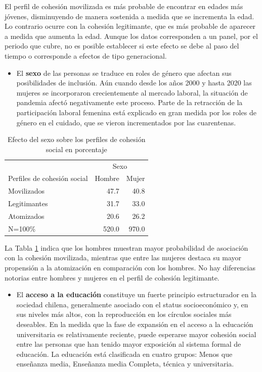 \documentclass[
  12pt,
]{book}
\providecommand{\tightlist}{%
  \setlength{\itemsep}{0pt}\setlength{\parskip}{0pt}}
\begin{document}
El perfil de cohesión movilizada es más probable de encontrar en edades más jóvenes, disminuyendo de manera sostenida a medida que se incrementa la edad. Lo contrario ocurre con la cohesión legitimante, que es más probable de aparecer a medida que aumenta la edad. Aunque los datos corresponden a un panel, por el periodo que cubre, no es posible establecer si este efecto se debe al paso del tiempo o corresponde a efectos de tipo generacional.

\begin{itemize}
\tightlist
\item
  El \textbf{sexo} de las personas se traduce en roles de género que afectan sus posibilidades de inclusión. Aún cuando desde los años 2000 y hasta 2020 las mujeres se incorporaron crecientemente al mercado laboral, la situación de pandemia afectó negativamente este proceso. Parte de la retracción de la participación laboral femenina está explicado en gran medida por los roles de género en el cuidado, que se vieron incrementados por las cuarentenas.
\end{itemize}

\begin{table}

\caption{\label{tab:clases-sexo}Efecto del sexo sobre los perfiles de cohesión social en porcentaje}
\centering
\begin{tabular}[t]{l|r|r}
\hline
\multicolumn{1}{c|}{ } & \multicolumn{2}{c}{Sexo} \\
\cline{2-3}
Perfiles de cohesión social & Hombre & Mujer\\
\hline
Movilizados & 47.7 & 40.8\\
\hline
Legitimantes & 31.7 & 33.0\\
\hline
Atomizados & 20.6 & 26.2\\
\hline
N=100\% & 520.0 & 970.0\\
\hline
\end{tabular}
\end{table}

La Tabla \ref{tab:clases-sexo} indica que los hombres muestran mayor probabilidad de asociación con la cohesión movilizada, mientras que entre las mujeres destaca su mayor propensión a la atomización en comparación con los hombres. No hay diferencias notorias entre hombres y mujeres en el perfil de cohesión legitimante.

\begin{itemize}
\tightlist
\item
  El \textbf{acceso a la educación} constituye un fuerte principio estructurador en la sociedad chilena, generalmente asociado con el status socioeconómico y, en sus niveles más altos, con la reproducción en los círculos sociales más deseables. En la medida que la fase de expansión en el acceso a la educación universitaria es relativamente reciente, puede esperarse mayor cohesión social entre las personas que han tenido mayor exposición al sistema formal de educación. La educación está clasificada en cuatro grupos: Menos que enseñanza media, Enseñanza media Completa, técnica y universitaria.
\end{itemize}
\end{document}
